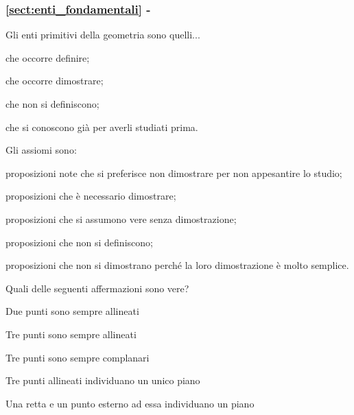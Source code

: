 \begingroup
\hypersetup{linkcolor=black}
\subsubsection*{\ref{sect:enti_fondamentali} - }
\endgroup

\begin{esercizio}
\label{ese:1.33}
Gli enti primitivi della geometria sono quelli...
\begin{enumeratea}
\item che occorre definire;
\item che occorre dimostrare;
\item che non si definiscono;
\item che si conoscono già per averli studiati prima.
\end{enumeratea}
\end{esercizio}

\begin{esercizio}
\label{ese:1.34}
Gli assiomi sono:
\begin{enumeratea}
\item proposizioni note che si preferisce non dimostrare per non appesantire lo studio;
\item proposizioni che è necessario dimostrare;
\item proposizioni che si assumono vere senza dimostrazione;
\item proposizioni che non si definiscono;
\item proposizioni che non si dimostrano perché la loro dimostrazione è molto semplice.
\end{enumeratea}
\end{esercizio}
	
\begin{esercizio}
\label{ese:1.35}
Quali delle seguenti affermazioni sono vere?
\begin{enumeratea}
\item Due punti sono sempre allineati		\tab\tab\tab\tab\boxV\quad\boxF
\item Tre punti sono sempre allineati		\tab\tab\tab\tab\boxV\quad\boxF
\item Tre punti sono sempre complanari		\tab\tab\tab\tab\boxV\quad\boxF
\item Tre punti allineati individuano un unico piano	\tab\tab\boxV\quad\boxF
\item Una retta e un punto esterno ad essa individuano un piano \tab\boxV\quad\boxF
\end{enumeratea}
\end{esercizio}

